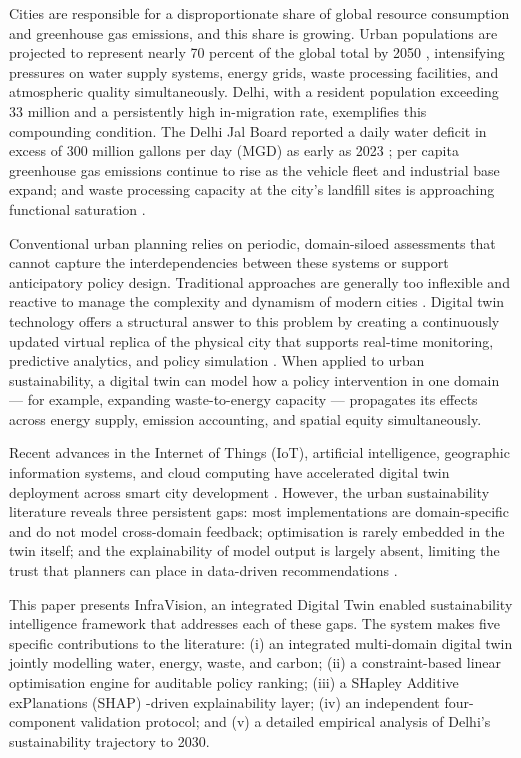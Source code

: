 \documentclass[conference]{IEEEtran}
\begin{document}
Cities are responsible for a disproportionate share of global resource
consumption and greenhouse gas emissions, and this share is growing.
Urban populations are projected to represent nearly 70 percent of the
global total by 2050 \cite{un2023}, intensifying pressures on water
supply systems, energy grids, waste processing facilities, and
atmospheric quality simultaneously. Delhi, with a resident population
exceeding 33 million and a persistently high in-migration rate,
exemplifies this compounding condition. The Delhi Jal Board reported a
daily water deficit in excess of 300 million gallons per day (MGD) as
early as 2023 \cite{djb2023}; per capita greenhouse gas emissions
continue to rise as the vehicle fleet and industrial base expand; and
waste processing capacity at the city's landfill sites is approaching
functional saturation \cite{cpcb2023}.

Conventional urban planning relies on periodic, domain-siloed
assessments that cannot capture the interdependencies between these
systems or support anticipatory policy design. Traditional approaches
are generally too inflexible and reactive to manage the complexity and
dynamism of modern cities \cite{therias2023}. Digital twin technology
offers a structural answer to this problem by creating a continuously
updated virtual replica of the physical city that supports real-time
monitoring, predictive analytics, and policy simulation
\cite{mazzetto2024}. When applied to urban sustainability, a digital
twin can model how a policy intervention in one domain --- for example,
expanding waste-to-energy capacity --- propagates its effects across
energy supply, emission accounting, and spatial equity simultaneously.

Recent advances in the Internet of Things (IoT), artificial
intelligence, geographic information systems, and cloud computing have
accelerated digital twin deployment across smart city development
\cite{alexandrov2024}. However, the urban sustainability literature
reveals three persistent gaps: most implementations are domain-specific
and do not model cross-domain feedback; optimisation is rarely embedded
in the twin itself; and the explainability of model output is largely
absent, limiting the trust that planners can place in data-driven
recommendations \cite{alkhateeb2024}.

This paper presents InfraVision, an integrated Digital Twin enabled
sustainability intelligence framework that addresses each of these gaps.
The system makes five specific contributions to the literature: (i) an
integrated multi-domain digital twin jointly modelling water, energy,
waste, and carbon; (ii) a constraint-based linear optimisation engine
for auditable policy ranking; (iii) a SHapley Additive exPlanations
(SHAP) \cite{lundberg2017}-driven explainability layer;
(iv) an independent four-component
validation protocol; and (v) a detailed empirical analysis of Delhi's
sustainability trajectory to 2030.
\end{document}
